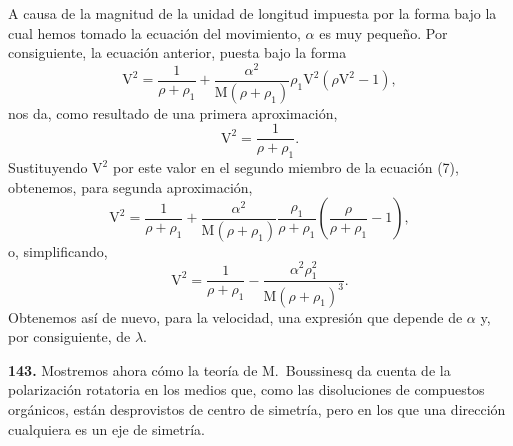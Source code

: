 A causa de la magnitud de la unidad de longitud impuesta por la forma bajo
la cual hemos tomado la ecuación del movimiento, $\alpha$ es muy pequeño.
Por consiguiente, la ecuación anterior, puesta bajo la forma
\begin{equation}
\mathrm V^2=\frac{1}{\rho+\rho_1}+\frac{\alpha^2}{\mathrm M(\rho+\rho_1)}
\rho_1\mathrm V^2(\rho\mathrm V^2-1),
\tag{7}
\end{equation}
nos da, como resultado de una primera aproximación,
\[
\mathrm V^2=\frac{1}{\rho+\rho_1}.
\]
Sustituyendo $\mathrm V^2$ por este valor en el segundo miembro de la
ecuación (7), obtenemos, para segunda aproximación,
\[
\mathrm V^2=\frac{1}{\rho+\rho_1}+\frac{\alpha^2}{\mathrm M(\rho+\rho_1)}
\frac{\rho_1}{\rho+\rho_1}\left(\frac{\rho}{\rho+\rho_1}-1\right),
\]
o, simplificando,
\[
\mathrm V^2=\frac{1}{\rho+\rho_1}-\frac{\alpha^2\rho_1^2}{\mathrm M(\rho+\rho_1)^3}.
\]
Obtenemos así de nuevo, para la velocidad, una expresión que depende de
$\alpha$ y, por consiguiente, de $\lambda$.

\noindent\textbf{143.} Mostremos ahora cómo la teoría de M.~Boussinesq da cuenta de la
polarización rotatoria en los medios que, como las disoluciones de
compuestos orgánicos, están desprovistos de centro de simetría, pero en
los que una dirección cualquiera es un eje de simetría.

